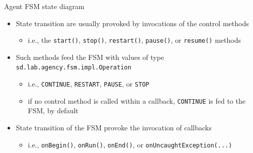\documentclass[presentation]{beamer}\mode<presentation>{\usetheme{AMSCesenaPurpleAndGold}}
\begin{document}
\begin{frame}[allowframebreaks]{Agent FSM state diagram}
\begin{itemize}
        \framebreak
        
        \item State transition are usually provoked by invocations of the \alert{control methods}
        \begin{itemize}
        	\item i.e., the \texttt{start()}, \texttt{stop()}, \texttt{restart()}, \texttt{pause()}, or \texttt{resume()} methods
        \end{itemize}
    
    	\bigskip
        
        \item Such methods feed the FSM with values of type \texttt{sd.lab.agency.fsm.impl.\alert{Operation}}
        \begin{itemize}
        	\item i.e., \texttt{CONTINUE}, \texttt{RESTART}, \texttt{PAUSE}, or \texttt{STOP} 
        	\item if no control method is called within a callback, \texttt{\alert{CONTINUE}} is fed to the FSM, by default
        \end{itemize}
        
        \bigskip
        
        \item State transition of the FSM provoke the invocation of callbacks
        \begin{itemize}
        	\item i.e., \texttt{onBegin()}, \texttt{onRun()}, \texttt{onEnd()}, or \texttt{onUncaughtException(...)}
        \end{itemize}
    \end{itemize}
    
    \framebreak
    

\end{frame}
\end{document}
